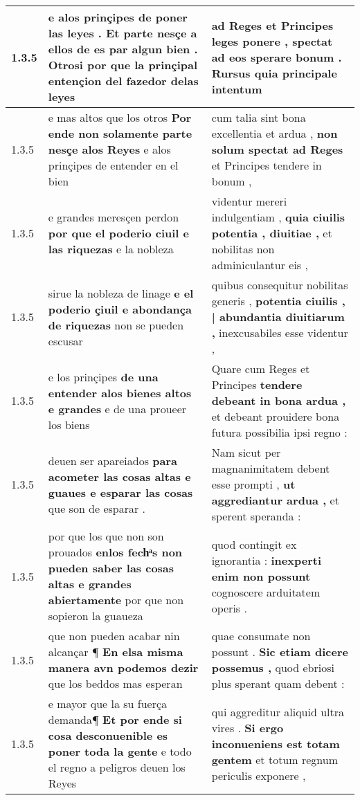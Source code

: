 \begin{tabular}{|p{1cm}|p{6.5cm}|p{6.5cm}|}
1.3.5 & e alos prinçipes de poner las leyes . \textbf{ Et parte nesçe a ellos de es par algun bien . } Otrosi por que la prinçipal entençion del fazedor delas leyes & ad Reges et Principes leges ponere , \textbf{ spectat ad eos sperare bonum . } Rursus quia principale intentum \\\hline
1.3.5 & e mas altos que los otros \textbf{ Por ende non solamente parte nesçe alos Reyes } e alos prinçipes de entender en el bien & cum talia sint bona excellentia et ardua , \textbf{ non solum spectat ad Reges } et Principes tendere in bonum , \\\hline
1.3.5 & e grandes meresçen perdon \textbf{ por que el poderio ciuil e las riquezas } e la nobleza & videntur mereri indulgentiam , \textbf{ quia ciuilis potentia , diuitiae , } et nobilitas non adminiculantur eis , \\\hline
1.3.5 & sirue la nobleza de linage \textbf{ e el poderio çiuil e abondança de riquezas } non se pueden escusar & quibus consequitur nobilitas generis , \textbf{ potentia ciuilis , | abundantia diuitiarum , } inexcusabiles esse videntur , \\\hline
1.3.5 & e los prinçipes \textbf{ de una entender alos bienes altos e grandes } e de una proueer los biens & Quare cum Reges et Principes \textbf{ tendere debeant in bona ardua , } et debeant prouidere bona futura possibilia ipsi regno : \\\hline
1.3.5 & deuen ser apareiados \textbf{ para acometer las cosas altas e guaues e esparar las cosas } que son de esparar . & Nam sicut per magnanimitatem debent esse prompti , \textbf{ ut aggrediantur ardua , } et sperent speranda : \\\hline
1.3.5 & por que los que non son prouados \textbf{ enlos fechͣs non pueden saber las cosas altas e grandes abiertamente } por que non sopieron la guaueza & quod contingit ex ignorantia : \textbf{ inexperti enim non possunt } cognoscere arduitatem operis . \\\hline
1.3.5 & que non pueden acabar nin alcançar ¶ \textbf{ En elsa misma manera avn podemos dezir } que los beddos mas esperan & quae consumate non possunt . \textbf{ Sic etiam dicere possemus , } quod ebriosi plus sperant quam debent : \\\hline
1.3.5 & e mayor que la su fuerça demanda¶ \textbf{ Et por ende si cosa desconuenible es poner toda la gente } e todo el regno a peligros deuen los Reyes & qui aggreditur aliquid ultra vires . \textbf{ Si ergo inconueniens est totam gentem } et totum regnum periculis exponere , \\\hline

\end{tabular}

